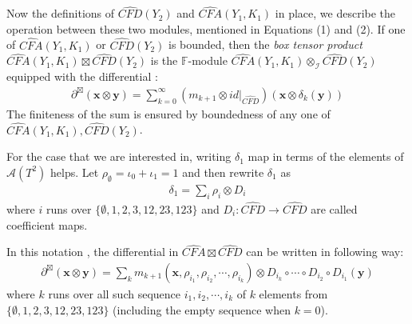 \documentclass[11pt,reqno]{amsart}
\theoremstyle{definition}
\newtheorem *{remark}{Remark}
\newcommand{\cfahat}{\widehat{\mathit{CFA}}}
\newcommand{\cfdhat}{\widehat{\mathit{CFD}}}
\begin{document}
Now the definitions of $\cfdhat(Y_2)$ and $\cfahat(Y_1,K_1)$ in place, we describe the operation between these two modules, mentioned in Equations (1) and (2).
If one of $\cfahat(Y_1,K_1)$ or $\cfdhat(Y_2)$ is bounded, then the \textit{box tensor product} $\cfahat(Y_1,K_1) \boxtimes \cfdhat(Y_2)$ is the $\mathbb{F}$-module $\cfahat(Y_1,K_1) \otimes_{\mathcal{I}} \cfdhat(Y_2)$ equipped with the differential :
\begin{align*}
    \partial^{\boxtimes}(\bm{x} \otimes \bm{y}) = \sum_{k=0}^{\infty} (m_{k+1}\otimes id|_{\cfdhat})(\bm{x}\otimes \delta_k(\bm{y}))
\end{align*}
The finiteness of the sum is ensured by boundedness of any one of $\cfahat(Y_1,K_1),\cfdhat(Y_2)$. 

For the case that we are interested in, writing $\delta_1$ map in terms of the elements of $\mathcal{A}(T^2)$ helps. Let $\rho_{\emptyset} = \iota_0 + \iota_1 = 1$ and then rewrite $\delta_1$ as 
\begin{align*}
    \delta_1 = \sum_i \rho_i \otimes D_i
\end{align*}
where $i$ runs over $\{\emptyset,1,2,3,12,23,123 \} $ and $D_i : \cfdhat \rightarrow \cfdhat$ are called coefficient maps. 

In this notation , the differential in $\cfahat \boxtimes \cfdhat$ can be written in following way:
\begin{align*}
    \partial^{\boxtimes} (\bm{x} \otimes \bm{y}) = \sum_k m_{k+1}(\bm{x}, \rho_{i_1},\rho_{i_2},\cdots,\rho_{i_k}) \otimes D_{i_k} \circ \cdots \circ D_{i_2}\circ D_{i_1}(\bm{y})
\end{align*}
 where $k$ runs over all such sequence $i_1, i_2, \cdots, i_k$ of $k$ elements from $\{ \emptyset, 1,2,3,12,23,123\}$ (including the empty sequence when $k = 0$).
\end{document}
